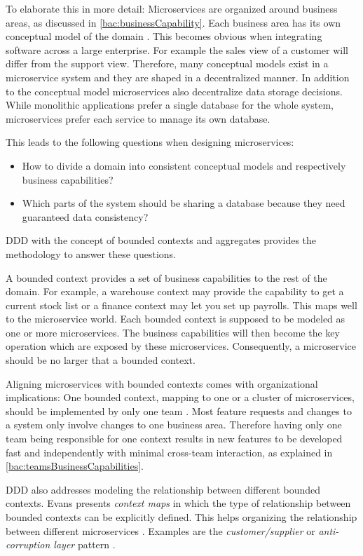 To elaborate this in more detail:
Microservices are organized around business areas, as discussed in \ref{bac:businessCapability}.
Each business area has its own conceptual model of the domain \citep{FowlerDecentralizedData2014}.
This becomes obvious when integrating software across a large enterprise.
For example the sales view of a customer will differ from the support view.
Therefore, many conceptual models exist in a microservice system and they are shaped in a decentralized manner. 
In addition to the conceptual model microservices also decentralize data storage decisions.
While monolithic applications prefer a single database for the whole system, microservices prefer each service to manage its own database. \citep{FowlerDecentralizedData2014}

This leads to the following questions when designing microservices:
\begin{itemize}
\item How to divide a domain into consistent conceptual models and respectively business capabilities?
\item Which parts of the system should be sharing a database because they need guaranteed data consistency?
\end{itemize}
\ac{DDD} with the concept of bounded contexts and aggregates provides the methodology to answer these questions.

A bounded context provides a set of business capabilities  to the rest of the domain.
For example, a warehouse context may provide the capability to get a current stock list or a finance context may let you set up payrolls.
This maps well to the microservice world.
Each bounded context is supposed to be modeled as one or more microservices.
The business capabilities will then become the key operation which are exposed by these microservices.
Consequently, a microservice should be no larger that a bounded context.
\citep[p. 34]{Newman2015}

Aligning microservices with bounded contexts comes with organizational implications:
One bounded context, mapping to one or a cluster of microservices, should be implemented by only one team \citep[p. 52]{Wolff2016}.
Most feature requests and changes to a system only involve changes to one business area.
Therefore having only one team being responsible for one context results in new features to be developed fast and independently with minimal cross-team interaction, as explained in \ref{bac:teamsBusinessCapabilities}.

\ac{DDD} also addresses modeling the relationship between different bounded contexts.
Evans presents \textit{context maps} in which the type of relationship between bounded contexts can be explicitly defined.
This helps organizing the relationship between different microservices \citep[p. 48]{Wolff2016}.
Examples are the \textit{customer/supplier} or \textit{anti-corruption layer} pattern \citep[p. 367]{Evans2004}.

